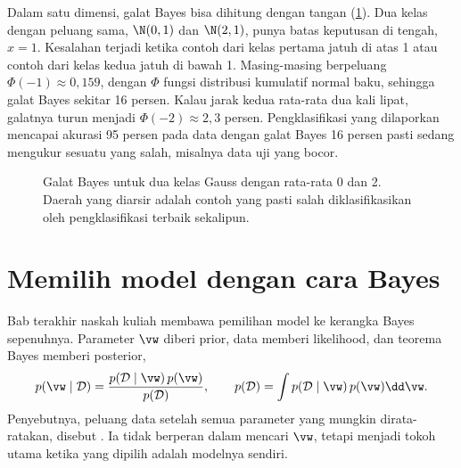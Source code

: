 Dalam satu dimensi, galat Bayes bisa dihitung dengan tangan (\cref{fig:bayeserror}). Dua kelas dengan peluang sama,
$\N(0,1)$ dan $\N(2,1)$, punya batas keputusan di tengah, $x=1$. Kesalahan terjadi ketika contoh dari kelas pertama jatuh di
atas 1 atau contoh dari kelas kedua jatuh di bawah 1. Masing-masing berpeluang $\Phi(-1)\approx0{,}159$, dengan $\Phi$ fungsi
distribusi kumulatif normal baku, sehingga galat Bayes sekitar 16 persen. Kalau jarak kedua rata-rata dua kali lipat, galatnya
turun menjadi $\Phi(-2)\approx2{,}3$ persen. Pengklasifikasi yang dilaporkan mencapai akurasi 95 persen pada data dengan galat
Bayes 16 persen pasti sedang mengukur sesuatu yang salah, misalnya data uji yang bocor.

\begin{figure}[ht]
\centering
{}
\caption{Galat Bayes untuk dua kelas Gauss dengan rata-rata 0 dan 2. Daerah yang diarsir adalah contoh yang pasti salah
diklasifikasikan oleh pengklasifikasi terbaik sekalipun.}
\label{fig:bayeserror}
\end{figure}

\section{Memilih model dengan cara Bayes}

Bab terakhir naskah kuliah membawa pemilihan model ke kerangka Bayes sepenuhnya. Parameter $\vw$ diberi prior, data memberi
likelihood, dan teorema Bayes memberi posterior,
\begin{equation}
p(\vw\mid\mathcal D)=\frac{p(\mathcal D\mid\vw)\,p(\vw)}{p(\mathcal D)},\qquad
p(\mathcal D)=\int p(\mathcal D\mid\vw)\,p(\vw)\dd\vw .
\end{equation}
Penyebutnya, peluang data setelah semua parameter yang mungkin dirata-ratakan, disebut . Ia tidak berperan
dalam mencari $\vw$, tetapi menjadi tokoh utama ketika yang dipilih adalah modelnya sendiri.

